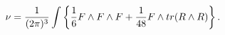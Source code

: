 \begin{equation}
\nu={1\over (2\pi)^3} \int \left\{ {1\over 6}F\wedge F\wedge F
+{1\over 48} F\wedge tr(R\wedge R)\right\}.
\end{equation}

